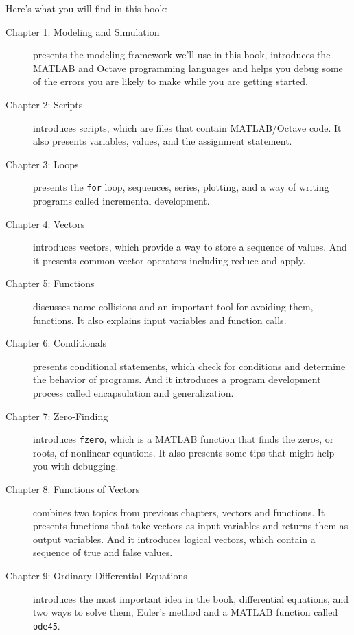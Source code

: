 Here's what you will find in this book:
\begin{description}
\item [Chapter 1: Modeling and Simulation] presents the modeling framework we'll use in this book, introduces the MATLAB and Octave programming languages and helps you debug some of the errors you are likely to make while you are getting started.

\item [Chapter 2: Scripts] introduces scripts, which are files that contain MATLAB/Octave code.  It also presents variables, values, and the assignment statement.

\item [Chapter 3: Loops] presents the {\tt for} loop, sequences, series, plotting, and a way of writing programs called incremental development.

\item [Chapter 4: Vectors] introduces vectors, which provide a way to store a sequence of values.  And it presents common vector operators including reduce and apply.

\item [Chapter 5: Functions] discusses name collisions and an important tool for avoiding them, functions.  It also explains input variables and function calls.

\item [Chapter 6: Conditionals] presents conditional statements, which check for conditions and determine the behavior of programs.  And it introduces a program development process called encapsulation and generalization.

\item [Chapter 7: Zero-Finding] introduces {\tt fzero}, which is a MATLAB function that finds the zeros, or roots, of nonlinear equations.  It also presents some tips that might help you with debugging.

\item [Chapter 8: Functions of Vectors] combines two topics from previous chapters, vectors and functions.  It presents functions that take vectors as input variables and returns them as output variables.  And it introduces logical vectors, which contain a sequence of true and false values.

\item [Chapter 9: Ordinary Differential Equations] introduces the most important idea in the book, differential equations, and two ways to solve them, Euler's method and a MATLAB function called {\tt ode45}.


\end{description}
